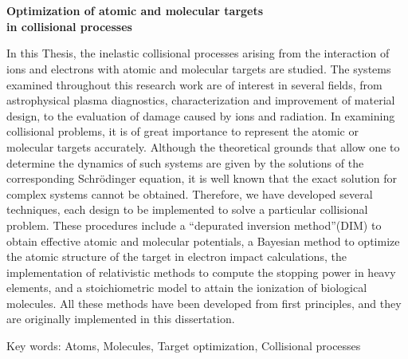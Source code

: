 \chapter*{}%
%

\begin{center}
\begin{large}
\textbf{Optimization of atomic and molecular targets \\ in collisional processes}
\end{large}
\end{center}

\vspace{1cm}
In this Thesis, the inelastic collisional processes arising from the 
interaction of ions and electrons with atomic and molecular targets are 
studied. The systems examined throughout this research work are of 
interest in several fields, from astrophysical plasma diagnostics, 
characterization and improvement of material design, to the evaluation 
of damage caused by ions and radiation. In examining collisional 
problems, it is of great importance to represent the atomic or 
molecular targets accurately. Although the theoretical grounds that 
allow one to determine the dynamics of such systems are given by the 
solutions of the corresponding Schrödinger equation, it is well known 
that the exact solution for complex systems cannot be obtained. 
Therefore, we have developed several techniques, each design to be 
implemented to solve a particular collisional problem. These procedures 
include a “depurated inversion method”(DIM) to obtain effective atomic 
and molecular potentials, a Bayesian method to optimize the atomic 
structure of the target in electron impact calculations, the 
implementation of relativistic methods to compute the stopping power in 
heavy elements, and a stoichiometric model to attain the ionization of 
biological molecules. All these methods have been developed from first 
principles, and they are originally implemented in this dissertation.

\vspace{1cm}
\noindent
Key words: 
Atoms, 
Molecules, 
Target optimization, 
Collisional processes

